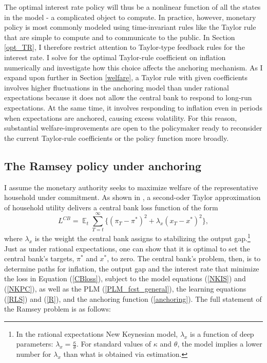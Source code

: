 \documentclass[11pt]{article}
\renewcommand{\[}{\begin{equation}}
\renewcommand{\]}{\end{equation}}
\DeclareMathOperator{\E}{\mathbb{E}}
\begin{document}
The optimal interest rate policy will thus be a nonlinear function of all the states in the model - a complicated object to compute. In practice, however, monetary policy is most commonly modeled using time-invariant rules like the Taylor rule that are simple to compute and to communicate to the public. In Section \ref{opt_TR}, I therefore restrict attention to Taylor-type feedback rules for the interest rate. I solve for the optimal Taylor-rule coefficient on inflation numerically and investigate how this choice affects the anchoring mechanism. As I expand upon further in Section \ref{welfare}, a Taylor rule with given coefficients involves higher fluctuations in the anchoring model than under rational expectations because it does not allow the central bank to respond to long-run expectations. At the same time, it involves responding to inflation even in periods when expectations are anchored, causing excess volatility. For this reason, substantial welfare-improvements are open to the policymaker ready to reconsider the current Taylor-rule coefficients or the policy function more broadly.

\subsection{The Ramsey policy under anchoring}\label{ramsey}
I assume the monetary authority seeks to maximize welfare of the representative household under commitment. As shown in \cite{woodford2011interest}, a second-oder Taylor approximation of household utility delivers a central bank loss function of the form
\begin{equation}
L^{CB} =\E_t \sum_{T=t}^{\infty}\{(\pi_T-\pi^*)^2 +\lambda_x(x_T - x^*)^2 \} \label{CBloss},
\end{equation}
where $\lambda_x$ is the weight the central bank assigns to stabilizing the output gap.\footnote{In the rational expectations New Keynesian model, $\lambda_x$ is a function of deep parameters: $\lambda_x = \frac{\kappa}{\theta}$. For standard values of $\kappa$ and $\theta$, the model implies a lower number for $\lambda_x$ than what is obtained via estimation.} Just as under rational expectations, one can show that it is optimal to set the central bank's targets, $\pi^*$ and $x^*$,  to zero. The central bank's problem, then, is to determine paths for inflation, the output gap and the interest rate that minimize the loss in Equation (\ref{CBloss}), subject to the model equations (\ref{NKIS}) and (\ref{NKPC}), as well as the PLM (\ref{PLM_fcst_general}), the learning equations (\ref{RLS}) and (\ref{R}), and the anchoring function (\ref{anchoring}). The full statement of the Ramsey problem is as follows:
\end{document}
